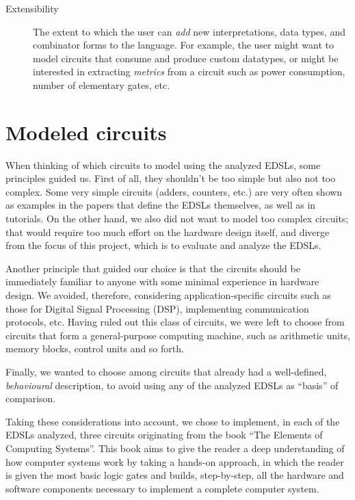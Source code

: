 \documentclass[a4paper]{article}
\begin{document}
\begin{description}
                \item[Extensibility]
                    The extent to which the user can \emph{add} new interpretations, data types, and
                    combinator forms to the language. For example, the user might want to model
                    circuits that consume and produce custom datatypes, or might be interested in
                    extracting \emph{metrics} from a circuit such as power consumption, number of
                    elementary gates, etc.
            \end{description}


    \section{Modeled circuits}
    \label{sec:circuits}
        When thinking of which circuits to model using the analyzed EDSLs, some principles guided
        us. First of all, they shouldn't be too simple but also not too complex. Some very simple
        circuits (adders, counters, etc.) are very often shown as examples in the papers that define
        the EDSLs themselves, as well as in tutorials. On the other hand, we also did not want to
        model too complex circuits; that would require too much effort on the hardware design
        itself, and diverge from the focus of this project, which is to evaluate and analyze the
        EDSLs.

        Another principle that guided our choice is that the circuits should be immediately familiar
        to anyone with some minimal experience in hardware design. We avoided, therefore,
        considering application-specific circuits such as those for Digital Signal Processing (DSP),
        implementing communication protocols, etc. Having ruled out this class of circuits, we were
        left to choose from circuits that form a general-purpose computing machine, such as
        arithmetic units, memory blocks, control units and so forth.

        Finally, we wanted to choose among circuits that already had a well-defined,
        \emph{behavioural} description, to avoid using any of the analyzed EDSLs as ``basis'' of
        comparison.

        Taking these considerations into account, we chose to implement, in each of the EDSLs
        analyzed, three circuits originating from the book ``The Elements of Computing
        Systems''\cite{nand2tetris-book}. This book aims to give the reader a deep understanding of
        how computer systems work by taking a hands-on approach, in which the reader is given the
        most basic logic gates and builds, step-by-step, all the hardware and software components
        necessary to implement a complete computer system.
\end{document}
